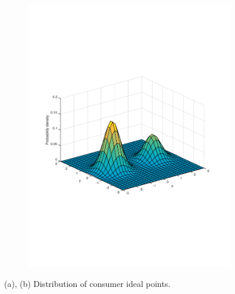 \documentclass[preprint, 12pt]{elsarticle}
\begin{document}
\begin{figure}[htp!]
\begin{subfigure}[t]{0.485\textwidth}
		\includegraphics[width=\textwidth, trim={15mm 90mm 20mm 70mm}]{Graphics/distribution_mu15_nratio2.pdf}
		\caption{}
		\label{fig:surface_mu15}
	\end{subfigure}
	\caption*{(a), (b) Distribution of consumer ideal points.}
	

\end{figure}
\end{document}
